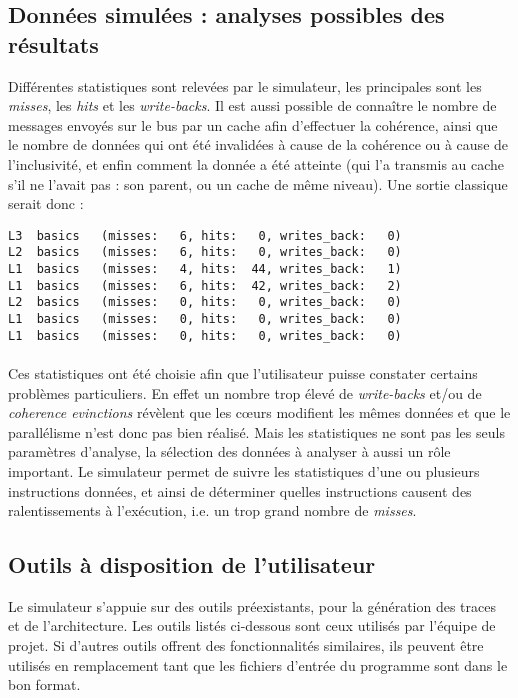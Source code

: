 \subsection{Données simulées : analyses possibles des résultats}

Différentes statistiques sont relevées par le simulateur, les principales sont les \emph{misses}, les \emph{hits} et les \emph{write-backs}. Il est aussi possible de connaître le nombre de messages envoyés sur le bus par un cache afin d'effectuer la cohérence, ainsi que le nombre de données qui ont été invalidées à cause de la cohérence ou à cause de l'inclusivité, et enfin comment la donnée a été atteinte (qui l'a transmis au cache s'il ne l'avait pas : son parent, ou un cache de même niveau). Une sortie classique serait donc :

\begin{lstlisting}
L3  basics   (misses:   6, hits:   0, writes_back:   0)
L2  basics   (misses:   6, hits:   0, writes_back:   0)
L1  basics   (misses:   4, hits:  44, writes_back:   1)
L1  basics   (misses:   6, hits:  42, writes_back:   2)
L2  basics   (misses:   0, hits:   0, writes_back:   0)
L1  basics   (misses:   0, hits:   0, writes_back:   0)
L1  basics   (misses:   0, hits:   0, writes_back:   0)
\end{lstlisting}

\paragraph{}
Ces statistiques ont été choisie afin que l'utilisateur puisse constater certains problèmes particuliers. En effet un nombre trop élevé de \emph{write-backs} et/ou de \emph{coherence evinctions} révèlent que les c\oe urs modifient les mêmes données et que le parallélisme n'est donc pas bien réalisé. Mais les statistiques ne sont pas les seuls paramètres d'analyse, la sélection des données à analyser à aussi un rôle important. Le simulateur permet de suivre les statistiques d'une ou plusieurs instructions données, et ainsi de déterminer quelles instructions causent des ralentissements à l'exécution, i.e. un trop grand nombre de \emph{misses}.

\subsection{Outils à disposition de l'utilisateur}

Le simulateur s'appuie sur des outils préexistants, pour la génération des traces et de l'architecture. Les outils listés ci-dessous sont ceux utilisés par l'équipe de projet. Si d'autres outils offrent des fonctionnalités similaires, ils peuvent être utilisés en remplacement tant que les fichiers d'entrée du programme sont dans le bon format.

